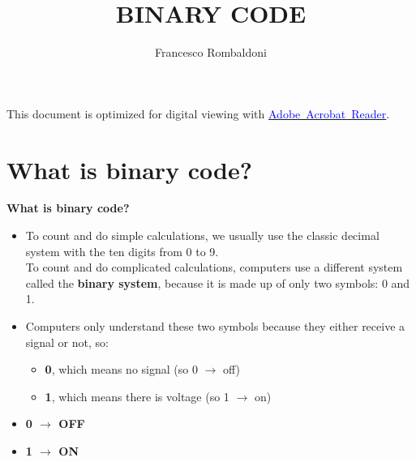 \documentclass[hidelinks,aspectratio=169]{beamer}
\title[BINARY CODE]{\textbf{BINARY CODE}}
\author{Francesco Rombaldoni}
\date{}
\begin{document}
	
	\begin{frame}
		\maketitle
		
		\vspace*{\fill}
		\centering
		\fboxrule=2pt
		\fbox
		{
			\begin{minipage}{0.9\linewidth}
				\small{This document is optimized for digital viewing with \href{https://get.adobe.com/reader/}{\textcolor{blue}{Adobe~Acrobat~Reader}}.}  
			\end{minipage}
		}
	\end{frame}
	
	\begin{frame}
		\tableofcontents
	\end{frame}
	
	\section{\textbf{What is binary code?}}
	\begin{frame}{\textbf{What is binary code?}}
		\begin{center}
			\begin{itemize}
				\item To count and do simple calculations, we usually use the classic decimal system with the ten digits from 0 to 9.\\
				To count and do complicated calculations, computers use a different system called the \textbf{binary system}, because it is made up of only two symbols: 0 and 1.
			\end{itemize}
			\vspace*{0.5cm}
			\begin{itemize}
				\item Computers only understand these two symbols because they either receive a signal or not, so:
				\begin{itemize}
					\item \textbf{0}, which means no signal (so 0 $\rightarrow$ off)
					\item \textbf{1}, which means there is voltage (so 1 $\rightarrow$ on)
				\end{itemize}
			\end{itemize}
		\end{center}
		\vspace*{0.5cm}
		\begin{center}
			\begin{itemize}
				\item \hspace*{5cm}\textbf{0 $\rightarrow$ OFF}
				\item \hspace*{5cm}\textbf{1 $\rightarrow$ ON}
			\end{itemize}
		\end{center}
	\end{frame}
	
\end{document}
